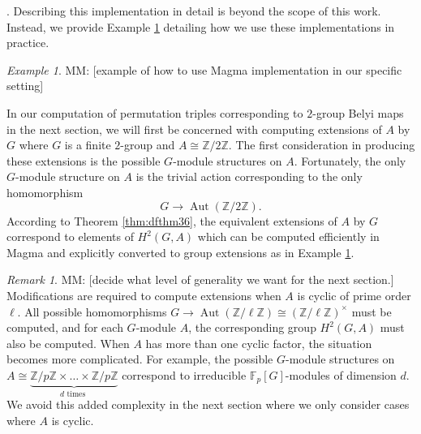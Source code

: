 \documentclass{dcthesis}
\newcommand{\ZZ}{\mathbb Z}
\newcommand{\mm}[1]{{\color{blue} \sf MM: [#1]}}
\newcommand{\FF}{\mathbb{F}}
\DeclareMathOperator{\Aut}{Aut}
\numberwithin{equation}{section}
\theoremstyle{definition}
\theoremstyle{remark}
\newtheorem{remark}[equation]{Remark}
\newtheorem{example}[equation]{Example}
\begin{document}
{{    \cite[Cohomology and group extensions]{magmabook}.
    Describing this implementation in detail is beyond the scope of this work.
    Instead, we provide
    Example \ref{exm:magmaH2example}
    detailing how we use these
    implementations in practice.
    \begin{example}
      \label{exm:magmaH2example}
      \mm{example of how to use \textsf{Magma} implementation in our specific setting}
    \end{example}
    In our computation of permutation triples
    corresponding to $2$-group Belyi maps
    in the next section,
    we will first be concerned with computing
    extensions of $A$ by $G$
    where $G$ is a finite $2$-group
    and $A\cong\ZZ/2\ZZ$.
    The first consideration in producing these
    extensions is the possible $G$-module
    structures on $A$.
    Fortunately,
    the only $G$-module structure on $A$
    is the trivial action
    corresponding to the only
    homomorphism
    \begin{equation}
      \label{eqn:trivialGmodule}
      G\to\Aut(\ZZ/2\ZZ).
    \end{equation}
    According to Theorem
    \ref{thm:dfthm36},
    the equivalent extensions of $A$ by $G$
    correspond to elements of $H^2(G,A)$
    which can be computed efficiently
    in \textsf{Magma}
    and explicitly converted to
    group extensions
    as in Example \ref{exm:magmaH2example}.
    \begin{remark}
      \mm{decide what level of generality we want for the next section.}
      \label{rmk:abelianconsiderations}
      Modifications are
      required to compute
      extensions when
      $A$ is cyclic of prime order $\ell$.
      All possible homomorphisms
      $
        G\to\Aut(\ZZ/\ell\ZZ)\cong
        (\ZZ/\ell\ZZ)^\times
      $
      must be computed,
      and for each $G$-module $A$,
      the corresponding group
      $H^2(G,A)$ must also be computed.
      When $A$ has more than one cyclic factor,
      the situation becomes more complicated.
      For example,
      the possible $G$-module structures on
      $A\cong\underbrace{\ZZ/p\ZZ\times\dots\times\ZZ/p\ZZ}_{d\text{ times }}$
      correspond to
      irreducible $\FF_p[G]$-modules of dimension
      $d$.
      We avoid this added complexity in the next
      section where we only consider
      cases where $A$ is cyclic.
    \end{remark}
  }
}
\end{document}
